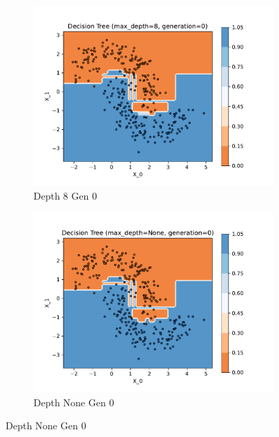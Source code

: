 \documentclass[acmconf,nonacm=true]{acmart}
\begin{document}
\begin{enumerate}
\begin{enumerate}
        \begin{figure}[H]
            \centering
            \begin{subfigure}[b]{0.5\textwidth}
                \includegraphics[width=\textwidth]{dt_depth_8_gen_0.pdf}
                \caption{Depth 8 Gen 0}
                \label{fig:dt_depth_8_gen_0}
            \end{subfigure}%
            \begin{subfigure}[b]{0.5\textwidth}
                \includegraphics[width=\textwidth]{dt_depth_None_gen_0.pdf}
                \caption{Depth None Gen 0}
                \label{fig:dt_depth_None_gen_0}
            \end{subfigure}
            \label{fig:1.1_row_3}
        \end{figure}


\end{enumerate}
\end{enumerate}
\end{document}
